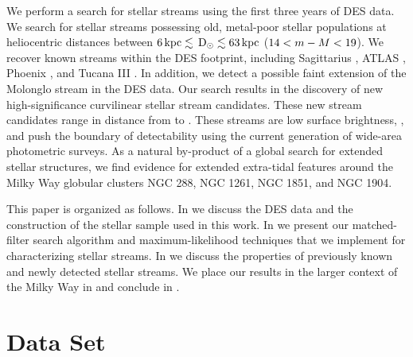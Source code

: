 \documentclass[twocolumn]{aastex61}
\begin{document}
We perform a search for stellar streams using the first three years of DES data.
We search for stellar streams possessing old, metal-poor stellar populations at heliocentric distances between $6\mathrm{\,kpc} \lesssim \mathrm{\,D_\odot} \lesssim 63\mathrm{\,kpc}$ ($14 < m - M < 19$).
We recover known streams within the DES footprint, including Sagittarius \citep{Newberg:2002}, ATLAS \citep{Koposov:2014}, Phoenix \citep{Balbinot:2016}, and Tucana III \citep{Drlica-Wagner:2015}. 
In addition, we detect a possible faint extension of the Molonglo stream \citep{Grillmair:2017} in the DES data.
Our search results in the discovery of \NSTREAMS new high-significance curvilinear stellar stream candidates.
These new stream candidates range in distance from \CHECK{$\roughly 13\kpc$} to \CHECK{$\roughly 50\kpc$}.
These streams are low surface brightness, , and push the boundary of detectability using the current generation of wide-area photometric surveys.
As a natural by-product of a global search for extended stellar structures, we find evidence for extended extra-tidal features around the Milky Way globular clusters NGC 288, NGC 1261, NGC 1851, and NGC 1904.

This paper is organized as follows.
In  we discuss the DES data and the construction of the stellar sample used in this work. 
In  we present our matched-filter search algorithm and maximum-likelihood techniques that we implement for characterizing stellar streams.
In  we discuss the properties of previously known and newly detected stellar streams.
We place our results in the larger context of the Milky Way in  and conclude in .


\section{Data Set}
\label{sec:data}
\end{document}
